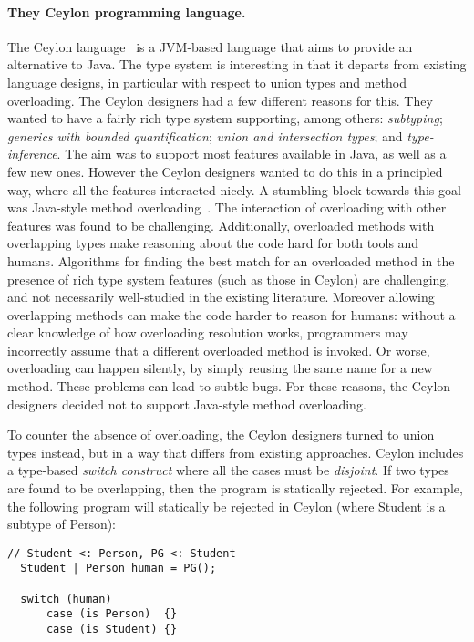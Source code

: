 \paragraph{They Ceylon programming language.}
The Ceylon language~\citep{king2013ceylon} is a JVM-based language that aims to provide an
alternative to Java. The type system is interesting
in that it departs from existing language designs, in particular
with respect to union types and method overloading.
The Ceylon designers had a few different
reasons for this. They wanted to have a fairly rich type system
supporting, among others: \emph{subtyping}; \emph{generics with bounded
quantification}; \emph{union and intersection types}; and \emph{type-inference}.
The aim was to support most features available
in Java, as well as a few new ones. However the Ceylon designers wanted to do this in
a principled way, where all the features interacted nicely.  A
stumbling block towards this goal was Java-style method
overloading~\citep{ceylonoverloading}.
The interaction of overloading with other
features was found to be challenging. Additionally,
overloaded methods with overlapping types
make reasoning about the code hard
for both tools and humans. Algorithms for finding the best match for an
overloaded method in the presence of rich type system features (such as
those in Ceylon) are challenging, and not necessarily well-studied in the
existing literature. Moreover allowing overlapping methods can make
the code harder to reason for humans: without a clear knowledge of how
overloading resolution works, programmers may incorrectly assume that
a different overloaded method is invoked. Or worse, overloading can
happen silently, by simply reusing the same name for a new
method. These problems can lead to subtle bugs.
For these reasons, the Ceylon designers decided not to support
Java-style method overloading.

To counter the absence of overloading, the Ceylon designers turned to
union types instead, but in a way that differs from
existing approaches. Ceylon includes a type-based
\emph{switch construct} where all the cases must be \emph{disjoint}.  If
two types are found to be overlapping, then the program is statically
rejected. For example, the following program will statically be
rejected in Ceylon (where Student is a subtype of Person):

\begin{lstlisting}
// Student <: Person, PG <: Student
  Student | Person human = PG();

  switch (human)
      case (is Person)  {}
      case (is Student) {}
\end{lstlisting}

